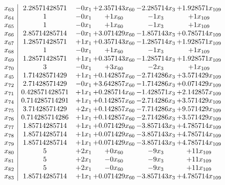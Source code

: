 \documentclass[11pt]{article}
\begin{document}
\[\begin{array}{c| c c@{\hskip 2pt} c@{\hskip 2pt} c@{\hskip 2pt} c@{\hskip 2pt} }
 x_{63}   &  2.28571428571 & -0 x_{1} & + 2.357143 x_{60} & -2.285714 x_{3} & + 1.928571 x_{109}\\
 x_{64}   &  1 & -0 x_{1} & + 1 x_{60} & -1 x_{3} & + 1 x_{109}\\
 x_{65}   &  1 & -0 x_{1} & + 1 x_{60} & -1 x_{3} & + 1 x_{109}\\
 x_{66}   &  2.85714285714 & -0 x_{1} & + 3.071429 x_{60} & -1.857143 x_{3} & + 0.785714 x_{109}\\
 x_{67}   &  1.28571428571 & + 1 x_{1} & + 0.357143 x_{60} & -1.285714 x_{3} & + 1.928571 x_{109}\\
 x_{68}   &  1 & -0 x_{1} & + 1 x_{60} & -1 x_{3} & + 1 x_{109}\\
 x_{69}   &  1.28571428571 & + 1 x_{1} & + 0.357143 x_{60} & -1.285714 x_{3} & + 1.928571 x_{109}\\
 x_{70}   &  3 & -0 x_{1} & + 3 x_{60} & -2 x_{3} & + 1 x_{109}\\
 x_{45}   &  1.71428571429 & + 1 x_{1} & + 0.142857 x_{60} & -2.714286 x_{3} & + 3.571429 x_{109}\\
 x_{72}   &  2.71428571429 & -0 x_{1} & + 3.642857 x_{60} & -1.714286 x_{3} & + 0.071429 x_{109}\\
 x_{71}   &  0.428571428571 & + 1 x_{1} & + 0.285714 x_{60} & -1.428571 x_{3} & + 2.142857 x_{109}\\
 x_{74}   &  0.714285714291 & + 1 x_{1} & + 0.142857 x_{60} & -2.714286 x_{3} & + 3.571429 x_{109}\\
 x_{75}   &  3.71428571429 & + 2 x_{1} & + 0.142857 x_{60} & -7.714286 x_{3} & + 9.571429 x_{109}\\
 x_{76}   &  0.714285714286 & + 1 x_{1} & + 0.142857 x_{60} & -2.714286 x_{3} & + 3.571429 x_{109}\\
 x_{77}   &  1.85714285714 & + 1 x_{1} & + 0.071429 x_{60} & -3.857143 x_{3} & + 4.785714 x_{109}\\
 x_{78}   &  1.85714285714 & + 1 x_{1} & + 0.071429 x_{60} & -3.857143 x_{3} & + 4.785714 x_{109}\\
 x_{79}   &  1.85714285714 & + 1 x_{1} & + 0.071429 x_{60} & -3.857143 x_{3} & + 4.785714 x_{109}\\
 x_{80}   &  5 & + 2 x_{1} & + 0 x_{60} & -9 x_{3} & + 11 x_{109}\\
 x_{81}   &  5 & + 2 x_{1} & -0 x_{60} & -9 x_{3} & + 11 x_{109}\\
 x_{82}   &  5 & + 2 x_{1} & -0 x_{60} & -9 x_{3} & + 11 x_{109}\\
 x_{83}   &  1.85714285714 & + 1 x_{1} & + 0.071429 x_{60} & -3.857143 x_{3} & + 4.785714 x_{109}\\

\end{array}\]
\end{document}

